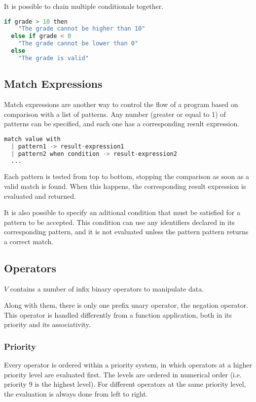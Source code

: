 \documentclass{article}
\begin{document}
It is possible to chain multiple conditionals together.

\begin{lstlisting}[language=V]
  if grade > 10 then
    "The grade cannot be higher than 10"
  else if grade < 0
    "The grade cannot be lower than 0"
  else
    "The grade is valid"
\end{lstlisting}

\subsection{Match Expressions}

Match expressions are another way to control the flow of a program based on comparison with a list of patterns.
Any number (greater or equal to 1) of patterns can be specified, and each one has a corresponding result expression.

\begin{lstlisting}[language=V]
  match value with
  | pattern1 -> result-expression1
  | pattern2 when condition -> result-expression2
  ...
\end{lstlisting}

Each pattern is tested from top to bottom, stopping the comparison as soon as a valid match is found.
When this happens, the corresponding result expression is evaluated and returned.

It is also possible to specify an aditional condition that must be satisfied for a pattern to be accepted.
This condition can use any identifiers declared in its corresponding pattern, and it is not evaluated unless the pattern pattern returns a correct match.

\subsection{Operators}

$V$ contains a number of infix binary operators to manipulate data.

Along with them, there is only one prefix unary operator, the negation operator.
This operator is handled differently from a function application, both in its priority and its associativity.

\subsubsection{Priority}

Every operator is ordered within a priority system, in which operators at a higher priority level are evaluated first.
The levels are ordered in numerical order (i.e. priority 9 is the highest level).
For different operators at the same priority level, the evaluation is always done from left to right.
\end{document}
